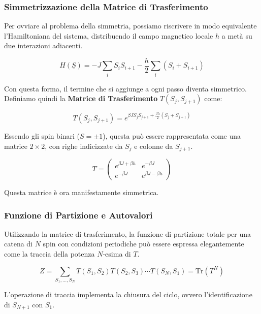 \subsubsection{Simmetrizzazione della Matrice di Trasferimento}

Per ovviare al problema della simmetria, possiamo riscrivere in modo equivalente l'Hamiltoniana del sistema, distribuendo il campo magnetico locale $h$ a metà su due interazioni adiacenti.

\begin{equation}
H(\underline{S}) = -J \sum_{i} S_i S_{i+1} - \frac{h}{2} \sum_{i} (S_i + S_{i+1})
\end{equation}

Con questa forma, il termine che si aggiunge a ogni passo diventa simmetrico. Definiamo quindi la \textbf{Matrice di Trasferimento} $T(S_j, S_{j+1})$ come:

\begin{equation}
T(S_j, S_{j+1}) = e^{\beta J S_j S_{j+1} + \frac{\beta h}{2} (S_j + S_{j+1})}
\end{equation}

Essendo gli spin binari ($S = \pm 1$), questa può essere rappresentata come una matrice $2 \times 2$, con righe indicizzate da $S_j$ e colonne da $S_{j+1}$.

\begin{equation}
T = 
\begin{pmatrix}
e^{\beta J + \beta h} & e^{-\beta J} \\
e^{-\beta J} & e^{\beta J - \beta h}
\end{pmatrix}
\end{equation}

Questa matrice è ora manifestamente simmetrica.

\subsubsection{Funzione di Partizione e Autovalori}

Utilizzando la matrice di trasferimento, la funzione di partizione totale per una catena di $N$ spin con condizioni periodiche può essere espressa elegantemente come la traccia della potenza $N$-esima di $T$.

\begin{equation}
Z = \sum_{S_1, \dots, S_N} T(S_1, S_2) T(S_2, S_3) \cdots T(S_N, S_1) = \text{Tr}(T^N)
\end{equation}

L'operazione di traccia implementa la chiusura del ciclo, ovvero l'identificazione di $S_{N+1}$ con $S_1$.

